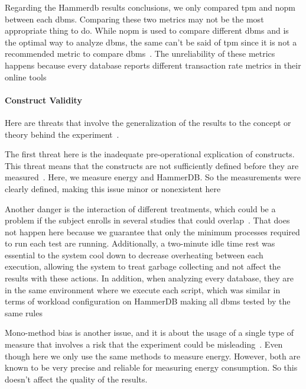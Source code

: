 

Regarding the Hammerdb results conclusions, we only compared \gls{tpm} and \gls{nopm} between each \gls{dbms}. Comparing these two metrics may not be the most appropriate thing to do. While \gls{nopm} is used to compare different \gls{dbms} and is the optimal way to analyze \gls{dbms}, the same can't be said of \gls{tpm} since it is not a recommended metric to compare \gls{dbms}~\cite{hammerdb}.
The unreliability of these metrics happens because every database reports different transaction rate metrics in their online tools




\paragraph{Construct Validity}

Here are threats that involve the generalization of the results to the concept or theory behind the experiment~\cite{10.5555/2349018}.


The first threat here is the inadequate pre-operational explication of constructs. This threat means that the constructs are not sufficiently defined before they are measured~\cite{10.5555/2349018}. Here, we measure energy and HammerDB. So the measurements were clearly defined, making this issue minor or nonexistent here

Another danger is the interaction of different treatments, which could be a problem if the subject enrolls in several studies that could overlap~\cite{10.5555/2349018}. That does not happen here because we guarantee that only the minimum processes required to run each test are running. Additionally, a two-minute idle time rest was essential to the system cool down to decrease overheating between each execution, allowing the system to treat garbage collecting and not affect the results with these actions. In addition, when analyzing every database, they are in the same environment where we execute each script, which was similar in terms of workload configuration on HammerDB making all \gls{dbms} tested by the same rules


Mono-method bias is another issue, and it is about the usage of a single type of measure that involves a risk that the experiment could be misleading~\cite{10.5555/2349018}. Even though here we only use the same methods to measure energy. However, both are known to be very precise and reliable for measuring energy consumption. So this doesn't affect the quality of the results.

